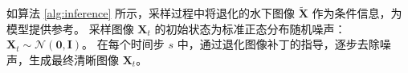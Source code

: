 如算法 \ref{alg:inference} 所示，采样过程中将退化的水下图像 $\tilde{\bm{X}}$ 作为条件信息，为模型提供参考。
采样图像 $\bm{X}_t$ 的初始状态为标准正态分布随机噪声：$\bm{X}_t \sim \mathcal{N}(\mathbf{0}, \mathbf{I})$。
在每个时间步 $s$ 中，通过退化图像补丁的指导，逐步去除噪声，生成最终清晰图像 $\bm{X}_t$。


